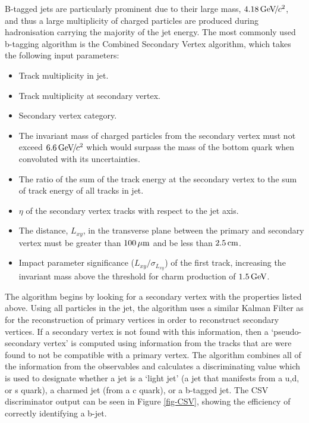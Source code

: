 B-tagged jets are particularly prominent due to their large mass, $4.18 {\,\text{Ge\hspace{-.08em}V\hspace{-0.16em}/\hspace{-0.08em}}c^\text{2}}$, and thus a large multiplicity of charged particles are produced during hadronisation carrying the majority of the jet energy. The most commonly used b-tagging algorithm is the Combined Secondary Vertex \cite{CSV} algorithm, which takes the following input parameters:

\begin{itemize}
	\item Track multiplicity in jet.
	\item Track multiplicity at secondary vertex.
	\item Secondary vertex category.
	\item The invariant mass of charged particles from the secondary vertex must not exceed $6.6 {\,\text{Ge\hspace{-.08em}V\hspace{-0.16em}/\hspace{-0.08em}}c^\text{2}}$ which would surpass the mass of the bottom quark when convoluted with its uncertainties.
	\item The ratio of the sum of the track energy at the secondary vertex to the sum of track energy of all tracks in jet.
	\item $\eta$ of the secondary vertex tracks with respect to the jet axis.
	\item The distance, $L_{xy}$, in the transverse plane between the primary and secondary vertex must be greater than $100 \,\mu\text{m}$ and be less than $2.5 \,\text{cm}$.
	\item Impact parameter significance ($L_{xy}/\sigma_{L_{xy}}$) of the first track, increasing the invariant mass above the threshold for charm production of $1.5 \,\text{Ge\hspace{-.08em}V}$.  
\end{itemize}

The algorithm begins by looking for a secondary vertex with the properties listed above. Using all particles in the jet, the algorithm uses a similar Kalman Filter \cite{VertexFitting} as for the reconstruction of primary vertices in order to reconstruct secondary vertices. If a secondary vertex is not found with this information, then a `pseudo-secondary vertex' is computed using information from the tracks that are were found to not be compatible with a primary vertex. The algorithm combines all of the information from the observables and calculates a discriminating value which is used to designate whether a jet is a `light jet' (a jet that manifests from a u,d, or s quark), a charmed jet (from a c quark), or a b-tagged jet. The CSV discriminator output can be seen in Figure \ref{fig-CSV}, showing the efficiency of correctly identifying a b-jet.

